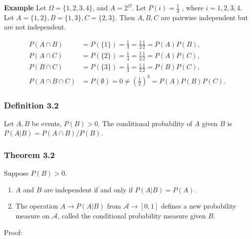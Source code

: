 \documentclass{article}
\begin{document}
{\bf Example} Let $\Omega = \{1, 2, 3, 4\}$, and $A = 2^\Omega$. Let $P(i) = \frac{1}{4}$ , where $i = 1, 2, 3, 4$. Let $A = \{1, 2\}, B = \{1, 3\}, C = \{2, 3\}$. Then $A, B, C$ are pairwise independent but are not independent.

\begin{align*}
P(A\cap B) &= P(\{1\}) = \frac{1}{4} = \frac{1}{2}\frac{1}{2} = P(A)P(B), \\
P(A \cap C) &= P(\{2\}) = \frac{1}{4} = \frac{1}{2}\frac{1}{2} = P(A)P(C), \\
P(B\cap C) &= P(\{3\}) = \frac{1}{4} = \frac{1}{2}\frac{1}{2} = P(B)P(C), \\
P(A\cap B \cap C) &= P(\emptyset) = 0 \neq \left(\frac{1}{2}\right)^3 = P(A)P(B)P(C).
\end{align*}

\subsubsection*{Definition 3.2} Let $A,B$ be events, $P(B) > 0$. The conditional probability of $A$ given $B$ is $P(A \vert B) = P(A\cap B) / P(B)$. \\

\subsubsection*{Theorem 3.2} Suppose $P(B) > 0$. 

\begin{enumerate}
\item $A$ and $B$ are independent if and only if $P(A \vert B) = P(A)$.

\item The operation $A \rightarrow P(A | B)$ from $\mathcal{A} \rightarrow [0, 1]$ defines a new probability
measure on $\mathcal{A}$, called the conditional probability measure given $B$.
\end{enumerate}

Proof: 
\end{document}
